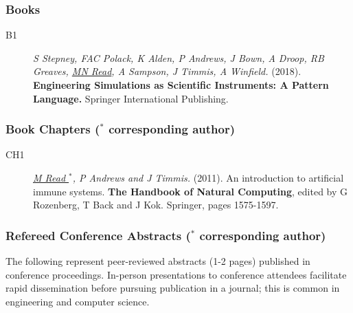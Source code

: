 \documentclass[a4paper]{article}
\begin{document}
\subsubsection*{Books}

\begin{description}
\item[B1]
\textit{S Stepney, FAC Polack, K Alden, P Andrews, J Bown, A Droop, RB Greaves, \underline{MN Read}, A Sampson, J Timmis, A Winfield.}
(2018).
\textbf{Engineering Simulations as Scientific Instruments: A Pattern Language.}
Springer International Publishing.
\end{description}


\subsubsection*{Book Chapters ($^{*}$ corresponding author)}

\begin{description}
\item[CH1]
\textit{\underline{M Read $^{*}$}, P Andrews and J Timmis.}
(2011).
An introduction to artificial immune systems.
\textbf{The Handbook of Natural Computing}, edited by G Rozenberg, T Back and J Kok.
Springer, pages 1575-1597.
\end{description}


\subsubsection*{Refereed Conference Abstracts ($^{*}$ corresponding author)}

The following represent peer-reviewed abstracts (1-2 pages) published in conference proceedings. In-person presentations to conference attendees facilitate rapid dissemination before pursuing publication in a journal; this is common in engineering and computer science.
\end{document}
